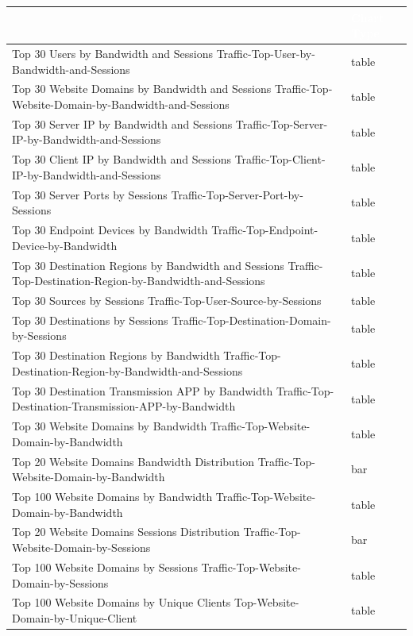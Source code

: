 \begin{longtable}{p{}|p{}}   
    \rowcolor{black}\multicolumn{1}{l!\vlinewhite}{\textcolor{white}{Name}}  & \textcolor{white}{Chart Type} \\\hline
    Top 30 Users by Bandwidth and Sessions Traffic-Top-User-by-Bandwidth-and-Sessions &	table \\\hline
    Top 30 Website Domains by Bandwidth and Sessions Traffic-Top-Website-Domain-by-Bandwidth-and-Sessions &	table \\\hline
    Top 30 Server IP by Bandwidth and Sessions Traffic-Top-Server-IP-by-Bandwidth-and-Sessions &	table \\\hline
    Top 30 Client IP by Bandwidth and Sessions Traffic-Top-Client-IP-by-Bandwidth-and-Sessions &	table \\\hline
    Top 30 Server Ports by Sessions Traffic-Top-Server-Port-by-Sessions &	table \\\hline
    Top 30 Endpoint Devices by Bandwidth Traffic-Top-Endpoint-Device-by-Bandwidth &	table \\\hline
    Top 30 Destination Regions by Bandwidth and Sessions Traffic-Top-Destination-Region-by-Bandwidth-and-Sessions &	table \\\hline
    Top 30 Sources by Sessions Traffic-Top-User-Source-by-Sessions &	table \\\hline
    Top 30 Destinations by Sessions Traffic-Top-Destination-Domain-by-Sessions &	table \\\hline
    Top 30 Destination Regions by Bandwidth Traffic-Top-Destination-Region-by-Bandwidth-and-Sessions &	table \\\hline
    Top 30 Destination Transmission APP by Bandwidth Traffic-Top-Destination-Transmission-APP-by-Bandwidth &	table \\\hline
    Top 30 Website Domains by Bandwidth Traffic-Top-Website-Domain-by-Bandwidth &	table  \\\hline
    Top 20 Website Domains Bandwidth Distribution Traffic-Top-Website-Domain-by-Bandwidth &	bar \\\hline
    Top 100 Website Domains by Bandwidth Traffic-Top-Website-Domain-by-Bandwidth &	table \\\hline
    Top 20 Website Domains Sessions Distribution Traffic-Top-Website-Domain-by-Sessions &	bar \\\hline
    Top 100 Website Domains by Sessions Traffic-Top-Website-Domain-by-Sessions &	table \\\hline
    Top 100 Website Domains by Unique Clients Top-Website-Domain-by-Unique-Client &	table \\\hline

\end{longtable}
